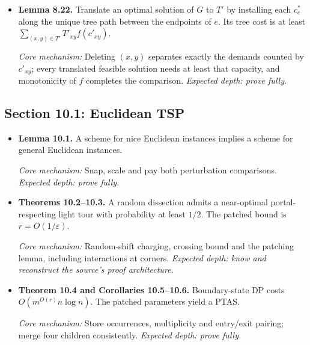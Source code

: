 \documentclass[11pt,a4paper]{article}
\newcommand{\1}{\mathbf 1}
\newcommand{\catalogue}[4]{%
  \item \textbf{#1.} #2\par
  {\footnotesize\emph{Core mechanism:} #3
  \emph{Expected depth: #4.}}}
\begin{document}
\begin{itemize}
\catalogue{Lemma 8.22}{Translate an optimal solution of $G$ to $T'$ by
installing each $c_e^*$ along the unique tree path between the endpoints of
$e$. Its tree cost is at least
$\sum_{(x,y)\in T'}T'_{xy}f(c'_{xy})$.}{Deleting $(x,y)$ separates exactly
the demands counted by $c'_{xy}$; every translated feasible solution needs
at least that capacity, and monotonicity of $f$ completes the comparison.}
{prove fully}
\end{itemize}

\subsection*{Section 10.1: Euclidean TSP}
\begin{itemize}
\catalogue{Lemma 10.1}{A scheme for nice Euclidean instances implies a scheme
for general Euclidean instances.}{Snap, scale and pay both perturbation comparisons.}{prove fully}
\catalogue{Theorems 10.2--10.3}{A random dissection admits a near-optimal
portal-respecting light tour with probability at least $1/2$. The patched bound
is $r=O(1/\varepsilon)$.}{Random-shift charging, crossing bound and the patching
lemma, including interactions at corners.}{know and reconstruct the source's proof architecture}
\catalogue{Theorem 10.4 and Corollaries 10.5--10.6}{Boundary-state DP costs
$O(m^{O(r)}n\log n)$. The patched parameters yield a PTAS.}{Store occurrences,
multiplicity and entry/exit pairing; merge four children consistently.}{prove fully}
\end{itemize}
\end{document}
